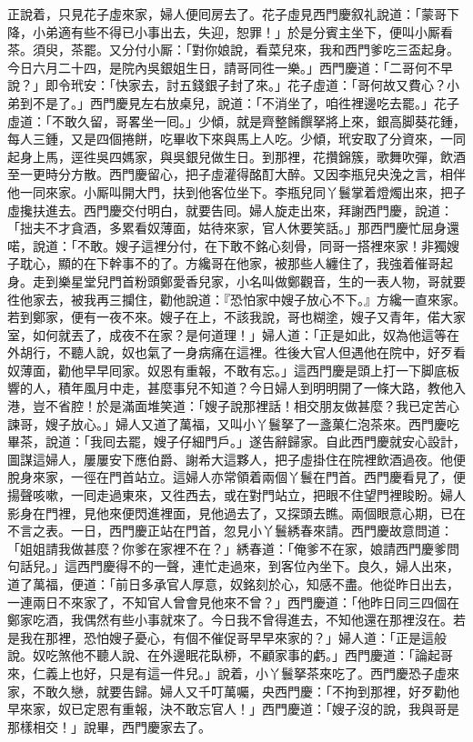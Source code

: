 正說着，只見花子虛來家，婦人便囘房去了。花子虛見西門慶叙礼說道：「蒙哥下降，小弟適有些不得已小事出去，失迎，恕罪！」於是分賓主坐下，便叫小厮看茶。須臾，茶罷。又分付小厮：「對你娘說，看菜兒來，我和西門爹吃三盃起身。今日六月二十四，是院內吳銀姐生日，請哥同徃一樂。」西門慶道：「二哥何不早說？」即令玳安：「快家去，討五錢銀子封了來。」花子虛道：「哥何故又費心？小弟到不是了。」西門慶見左右放桌兒，說道：「不消坐了，咱徃裡邊吃去罷。」花子虛道：「不敢久留，哥畧坐一囘。」少傾，就是齊整餚饌拏將上來，銀高脚葵花鍾，每人三鍾，又是四個捲餅，吃畢收下來與馬上人吃。少傾，玳安取了分資來，一同起身上馬，逕徃吳四媽家，與吳銀兒做生日。到那裡，花攢錦簇，歌舞吹彈，飲酒至一更時分方散。西門慶留心，把子虛灌得酩酊大醉。又因李瓶兒央浼之言，相伴他一同來家。小厮叫開大門，扶到他客位坐下。李瓶兒同丫鬟掌着燈燭出來，把子虛攙扶進去。西門慶交付明白，就要告囘。婦人旋走出來，拜謝西門慶，說道：「拙夫不才貪酒，多累看奴薄面，{}姑待來家，官人休要笑話。」那西門慶忙屈身還喏，說道：「不敢。嫂子這裡分付，在下敢不銘心刻骨，同哥一搭裡來家！非獨嫂子耽心，顯的在下幹事不的了。方纔哥在他家，被那些人纏住了，我強着催哥起身。走到樂星堂兒門首粉頭鄭愛香兒家，{}小名叫做鄭觀音，生的一表人物，哥就要徃他家去，被我再三攔住，勸他說道：『恐怕家中嫂子放心不下。』方纔一直來家。若到鄭家，便有一夜不來。{}嫂子在上，不該我說，哥也糊塗，嫂子又青年，{}偌大家室，如何就丟了，成夜不在家？是何道理！」婦人道：「正是如此，奴為他這等在外胡行，不聽人說，奴也氣了一身病痛在這裡。{}徃後大官人但遇他在院中，好歹看奴薄面，勸他早早囘家。奴恩有重報，不敢有忘。」{}這西門慶是頭上打一下脚底板響的人，積年風月中走，甚麼事兒不知道？今日婦人到明明開了一條大路，教他入港，豈不省腔！於是滿面堆笑道：「嫂子說那裡話！相交朋友做甚麼？我已定苦心諫哥，嫂子放心。」婦人又道了萬福，又叫小丫鬟拏了一盞菓仁泡茶來。西門慶吃畢茶，說道：「我囘去罷，嫂子仔細門戶。」遂告辭歸家。自此西門慶就安心設計，圖謀這婦人，屢屢安下應伯爵、謝希大這夥人，把子虛掛住在院裡飲酒過夜。他便脫身來家，一徑在門首站立。這婦人亦常領着兩個丫鬟在門首。西門慶看見了，便揚聲咳嗽，一囘走過東來，又徃西去，{}或在對門站立，把眼不住望門裡睃盼。婦人影身在門裡，見他來便閃進裡面，見他過去了，又探頭去瞧。兩個眼意心期，已在不言之表。一日，西門慶正站在門首，忽見小丫鬟綉春來請。西門慶故意問道：「姐姐請我做甚麼？你爹在家裡不在？」綉春道：「俺爹不在家，娘請西門慶爹問句話兒。」這西門慶得不的一聲，連忙走過來，到客位內坐下。良久，婦人出來，道了萬福，便道：「前日多承官人厚意，奴銘刻於心，知感不盡。他從昨日出去，一連兩日不來家了，不知官人曾會見他來不曾？」西門慶道：「他昨日同三四個在鄭家吃酒，我偶然有些小事就來了。今日我不曾得進去，不知他還在那裡沒在。若是我在那裡，恐怕嫂子憂心，有個不催促哥早早來家的？」婦人道：「正是這般說。奴吃煞他不聽人說、在外邊眠花臥桺，不顧家事的虧。」西門慶道：「論起哥來，仁義上也好，只是有這一件兒。」說着，小丫鬟拏茶來吃了。西門慶恐子虛來家，不敢久戀，就要告歸。婦人又千叮萬囑，央西門慶：「不拘到那裡，好歹勸他早來家，奴已定恩有重報，決不敢忘官人！」{}西門慶道：「嫂子沒的說，我與哥是那樣相交！」說畢，西門慶家去了。

